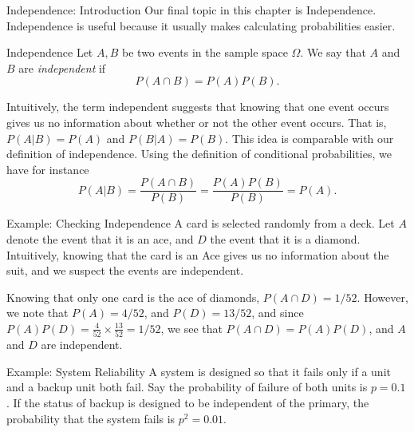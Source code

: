 \begin{frame}[allowframebreaks]{Independence: Introduction}
  Our final topic in this chapter is Independence.
  Independence is useful because it usually makes calculating probabilities easier.
  
  \begin{block}{Independence}
    Let $A, B$ be two events in the sample space $\Omega$. We say that $A$ and $B$ are \emph{independent} if
    $$
    P(A \cap B) = P(A)P(B).
    $$
  \end{block}
  
  \framebreak
  
  Intuitively, the term \alert{independent} suggests that knowing that one event occurs gives us no information about whether or not the other event occurs.
  That is, $P(A | B) = P(A)$ and $P(B | A) = P(B)$.
  This idea is comparable with our definition of independence.
  Using the definition of conditional probabilities, we have for instance 
  $$
  P(A|B) = \frac{P(A \cap B)}{P(B)} = \frac{P(A)P(B)}{P(B)} = P(A).
  $$
  
  \begin{exampleblock}{Example: Checking Independence}
    A card is selected randomly from a deck. Let $A$ denote the event that it is an ace, and $D$ the event that it is a diamond.
    Intuitively, knowing that the card is an Ace gives us no information about the suit, and we suspect the events are independent.
    
    Knowing that only one card is the ace of diamonds, $P(A \cap D) = 1/52$. However, we note that $P(A) = 4/52$, and $P(D) = 13/52$, and since $P(A)P(D) = \frac{4}{52}\times\frac{13}{52} = 1/52$, we see that $P(A \cap D) = P(A)P(D)$, and $A$ and $D$ are independent.
  \end{exampleblock}
  
  \begin{exampleblock}{Example: System Reliability}
    A system is designed so that it fails only if a unit and a backup unit both fail.
    Say the probability of failure of both units is $p = 0.1$.
    If the status of backup is designed to be independent of the primary, the probability that the system fails is $p^2 = 0.01$.
  \end{exampleblock}
  
\end{frame}

